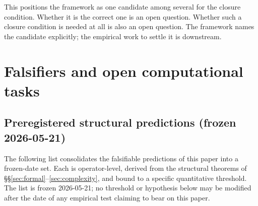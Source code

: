 \documentclass[11pt]{article}
\theoremstyle{plain}
\theoremstyle{definition}
\theoremstyle{remark}
\begin{document}
This positions the framework as one candidate among several for the closure condition. Whether it is the correct one is an open question. Whether such a closure condition is needed at all is also an open question. The framework names the candidate explicitly; the empirical work to settle it is downstream.

\section{Falsifiers and open computational tasks}\label{sec:predictions}

\subsection{Preregistered structural predictions (frozen 2026-05-21)}\label{sec:preregistered-existence}

The following list consolidates the falsifiable predictions of this paper into a frozen-date set. Each is operator-level, derived from the structural theorems of \S\S\ref{sec:formal}--\ref{sec:complexity}, and bound to a specific quantitative threshold. The list is frozen 2026-05-21; no threshold or hypothesis below may be modified after the date of any empirical test claiming to bear on this paper.
\end{document}
